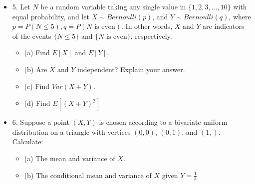 \documentclass{article}
\begin{document}
\begin{itemize}
\begin{itemize}
\begin{itemize}
            \item This is likely to hold because the $X_i$ is fixed between two levels, so there won't be any outliers and $Y_i$ is either 0 or 1, so there won't be any outliers, so $E[u_i^4]$ must also be finite.
        \end{itemize}
        \item Say we run the regression with a relaxation of $X_i$ to a variety of price levels. We get $\hat{Y}_i$. Do we get a reasonable estimator for $Y_i$?
        \begin{itemize}
            \item Because this is a linear regression, predictions of $\hat{Y}_i$ may be below 0 or above 1 for certain values of $X_i$, which is a nonsensical result.
        \end{itemize}
    \end{itemize}
    \item 5. Let $N$ be a random variable taking any single value in $\{1,2,3,\dots,10\}$ with equal probability, and let $X \sim Bernoulli(p)$, and $Y \sim Bernoulli(q)$, where $p = P(N \le 5), q = P(N \text{ is even})$. In other words, $X$ and $Y$ are indicators of the events $\{N \le 5\}$ and $\{N \text{ is even}\}$, respectively.
    \begin{itemize}
        \item (a) Find $E[X]$ and $E[Y]$.
        \item (b) Are $X$ and $Y$ independent? Explain your answer.
        \item (c) Find $Var(X+Y)$.
        \item (d) Find $E[(X+Y)^2]$
    \end{itemize}
    \item 6. Suppose a point $(X,Y)$ is chosen according to a bivariate uniform distribution on a triangle with vertices $(0,0)$, $(0,1)$, and $(1,)$. Calculate:
    \begin{itemize}
        \item (a) The mean and variance of $X$.
        \item (b) The conditional mean and variance of $X$ given $Y = \frac{1}{3}$
    \end{itemize}
\end{itemize}
\end{document}
